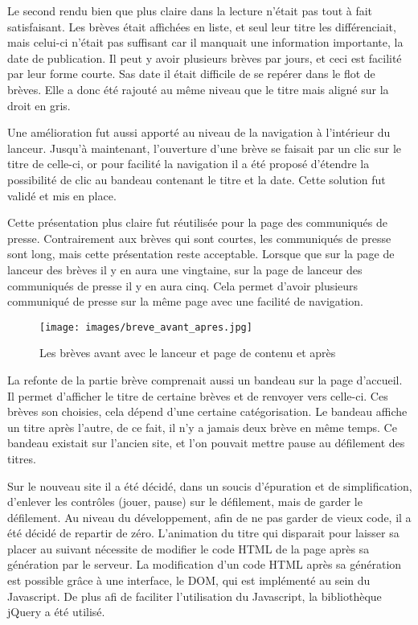 \documentclass[12pt,a4paper]{article}
\begin{document}
\medskip
Le second rendu bien que plus claire dans la lecture n'était pas tout à fait satisfaisant. Les brèves était affichées en liste, et seul leur titre les différenciait, mais celui-ci n'était pas suffisant car il manquait une information importante, la date de publication. Il peut y avoir plusieurs brèves par jours, et ceci est facilité par leur forme courte. Sas date il était difficile de se repérer dans le flot de brèves. Elle a donc été rajouté au même niveau que le titre mais aligné sur la droit en gris.\par
Une amélioration fut aussi apporté au niveau de la navigation à l'intérieur du lanceur. Jusqu'à maintenant, l'ouverture d'une brève se faisait par un clic sur le titre de celle-ci, or pour facilité la navigation il a été proposé d'étendre la possibilité de clic au bandeau contenant le titre et la date. Cette solution fut validé et mis en place.\par
\medskip
Cette présentation plus claire fut réutilisée pour la page des communiqués de presse. Contrairement aux brèves qui sont courtes, les communiqués de presse sont long, mais cette présentation reste acceptable. Lorsque que sur la page de lanceur des brèves il y en aura une vingtaine, sur la page de lanceur des communiqués de presse il y en aura cinq. Cela permet d'avoir plusieurs communiqué de presse sur la même page avec une facilité de navigation.\par
\begin{figure}[h!]
\centering\texttt{[image: images/breve\_avant\_apres.jpg]} 
\caption{Les brèves avant avec le lanceur et page de contenu et après}
\end{figure}
\bigskip 
La refonte de la partie brève comprenait aussi un bandeau sur la page d'accueil. Il permet d'afficher le titre de certaine brèves et de renvoyer vers celle-ci. Ces brèves son choisies, cela dépend d'une certaine catégorisation. Le bandeau affiche un titre après l'autre, de ce fait, il n'y a jamais deux brève en même temps. Ce bandeau existait sur l'ancien site, et l'on pouvait mettre pause au défilement des titres.\par 
Sur le nouveau site il a été décidé, dans un soucis d'épuration et de simplification, d'enlever les contrôles (jouer, pause) sur le défilement, mais de garder le défilement. Au niveau du développement, afin de ne pas garder de vieux code, il a été décidé de repartir de zéro. L'animation du titre qui disparait pour laisser sa placer au suivant nécessite de modifier le code HTML de la page après sa génération par le serveur. La modification d'un code HTML après sa génération est possible grâce à une interface, le DOM, qui est implémenté au sein du Javascript. De plus afi de faciliter l'utilisation du Javascript, la bibliothèque jQuery a été utilisé.\par 
\end{document}
